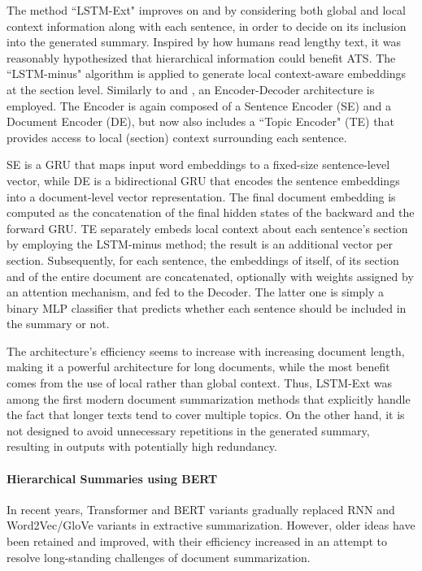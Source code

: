 \documentclass[preprint,review,10pt]{elsarticle}
\begin{document}
	The method ``LSTM-Ext" \cite{xiao} improves on \cite{lapata} and \cite{nallapati} by considering both global and local context information along with each sentence, in order to decide on its inclusion into the generated summary. Inspired by how humans read lengthy text, it was reasonably hypothesized that hierarchical information could benefit ATS. The ``LSTM-minus" algorithm \cite{wang} is applied to generate local context-aware embeddings at the section level. Similarly to \cite{lapata} and \cite{nallapati}, an Encoder-Decoder architecture is employed. The Encoder is again composed of a Sentence Encoder (SE) and a Document Encoder (DE), but now also includes a ``Topic Encoder" (TE) that provides access to local (section) context surrounding each sentence.
	
	SE is a GRU that maps input word embeddings to a fixed-size sentence-level vector, while DE is a bidirectional GRU that encodes the sentence embeddings into a document-level vector representation. The final document embedding is computed as the concatenation of the final hidden states of the backward and the forward GRU. TE \cite{wang} separately embeds local context about each sentence's section by employing the LSTM-minus method; the result is an additional vector per section. Subsequently, for each sentence, the embeddings of itself, of its section and of the entire document are concatenated, optionally with weights assigned by an attention mechanism, and fed to the Decoder. The latter one is simply a binary MLP classifier that predicts whether each sentence should be included in the summary or not.
	
	The architecture's efficiency seems to increase with increasing document length, making it a powerful architecture for long documents, while the most benefit comes from the use of local rather than global context. Thus, LSTM-Ext was among the first modern document summarization methods that explicitly handle the fact that longer texts tend to cover multiple topics. On the other hand, it is not designed to avoid unnecessary repetitions in the generated summary, resulting in outputs with potentially high redundancy.
	
	\paragraph{Hierarchical Summaries using BERT} In recent years, Transformer and BERT variants gradually replaced RNN and Word2Vec/GloVe variants in extractive summarization. However, older ideas have been retained and improved, with their efficiency increased in an attempt to resolve long-standing challenges of document summarization.\label{sssec: HierBERT}
	
\end{document}
